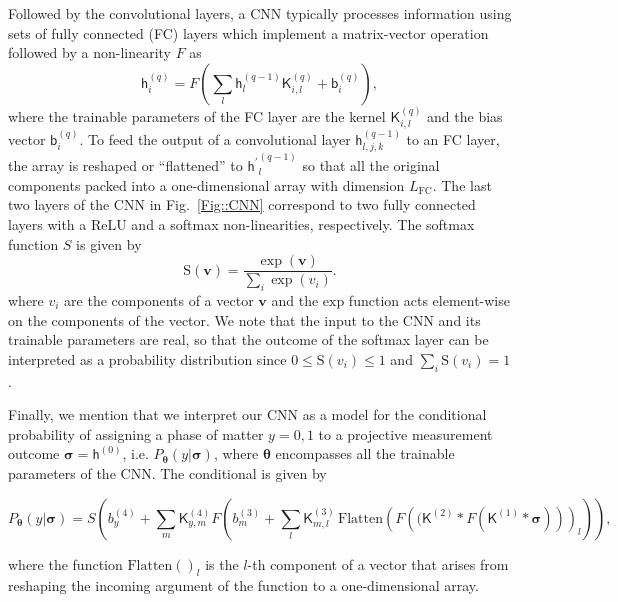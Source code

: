 \documentclass[twocolumn,english,reprint,superscriptaddress,longbibliography,pra]{revtex4-1}
\begin{document}
Followed by the convolutional layers, a CNN typically processes information using sets of fully connected (FC) layers which implement a matrix-vector operation followed by a non-linearity $F$ as
\begin{equation}
\mathsf{h}^{(q)}_{i}  =  F\left(\sum_{l} \mathsf{h}^{(q-1)}_{l}  \mathsf{K}^{(q)}_{i,l} + \mathsf{b}^{(q)}_{i}\right), 
\end{equation}
where the trainable parameters of the FC layer are the kernel $\mathsf{K}^{(q)}_{i,l}$ and the bias vector $ \mathsf{b}^{(q)}_{i}$. 
To feed  the output of a convolutional layer $\mathsf{h}^{(q-1)}_{l,j,k}$ to an FC layer, the array is reshaped or ``flattened'' to   $\mathsf{h^{\prime}}^{(q-1)}_{l}$ so that all the original components packed into a one-dimensional array with dimension $L_{\text{FC}}$. The last two layers of the CNN in Fig.~\ref{Fig::CNN} correspond to two fully connected layers with a ReLU  and a softmax non-linearities, respectively. The softmax function $S$ is given by 
\begin{equation}
  \text{S}(\bm{v}) = \frac{\exp(\bm{v})}{\sum_i \exp(v_i)}.  
\end{equation}
where $v_i$ are the components of a vector $\bm{v}$ and the $\text{exp}$ function acts element-wise on the components of the vector. We note that the input to the CNN and its trainable parameters are real, so that the outcome of the softmax layer can be interpreted as a probability distribution since $0 \le \text{S}(v_i)\le 1$ and $\sum_{i}\text{S}(v_i)=1$.

Finally, we mention that we interpret our CNN as a model for the conditional probability of assigning a phase of matter $y=0,1$ to a projective  measurement outcome $\bm{\sigma}=\mathsf{h}^{(0)}$, i.e. $P_{\bm{\theta}}(y|\bm{\sigma})$, where $\bm{\theta}$ encompasses all the trainable parameters of the CNN. The conditional is given by 
\begin{widetext}
\begin{equation}
 P_{\bm{\theta}}(y|\bm{\sigma}) = S\left( b^{(4)}_{y} + \sum_{m}\mathsf{K}^{(4)}_{y,m} F\left(b^{(3)}_{m} + \sum_{l} \mathsf{K}^{(3)}_{m,l}\,\text{Flatten}\left(F\left((\mathsf{K}^{(2)}*F\left(\mathsf{K}^{(1)}*\bm{\sigma} \right)\right)\right)_{l}\right)       \right), 
 \label{Eq::CNNdist}
\end{equation}
\end{widetext}
where the function $\text{Flatten}()_{l}$ is the $l$-th component of a vector that arises from reshaping the incoming argument of the function to a one-dimensional array.  
\end{document}
